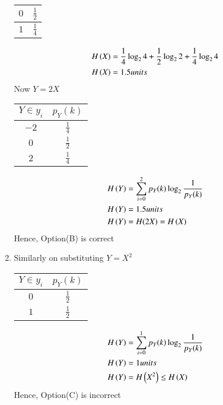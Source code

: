 \documentclass[journal,12pt,onecolumn]{IEEEtran}
\theoremstyle{remark}
\begin{document}
\begin{enumerate}
\begin{table}[htpb]
\begin{tabular}{|c|c|}
\hline
$0$                         & $\frac{1}{2}$  \\
\hline
$1$                         & $\frac{1}{4} $ \\
\hline
\end{tabular}
\end{table}
\begin{align}
H\left(X\right) &= \frac{1}{4}\log _{2}4 + \frac{1}{2}\log _{2}2 +\frac{1}{4}\log _{2}4\\
H\left(X\right) &=  1.5 units
 \end{align}
 Now $ Y = 2X$
 \begin{table}[htpb]
\centering 
\begin{tabular}{|c|c|}
\hline
$Y \in y_i$	&          $p_Y(k)$\\
\hline
$-2$                         & $\frac{1}{4} $       \\
\hline
$0$                         & $\frac{1}{2} $ \\
\hline
$2$                         & $\frac{1}{4}$ \\
\hline
\end{tabular}
\end{table}
\begin{align}
H\left(Y\right) &= \sum_{i=0}^{2}p_Y(k) \log _{2} \frac{1}{p_Y(k)}\\
H\left(Y\right) &=  1.5 units\\
  H\left(Y\right) &= H(2X) =H\left(X\right)
 \end{align}
 Hence, Option(B) is correct\\
 \item Similarly on substituting $Y = X^2$\\
  \begin{table}[htpb]
\centering 
\begin{tabular}{|c|c|}
\hline
$Y \in y_i$	&	$p_Y(k)$\\
\hline
$0$                         & $\frac{1}{2} $       \\
\hline
$1$                         & $\frac{1}{2} $ \\
\hline
\end{tabular}
\end{table}
 \begin{align}
H\left(Y\right) &= \sum_{i=0}^{1}p_Y(k) \log _{2} \frac{1}{p_Y(k)}\\
H\left(Y\right) &=  1units\\
  H\left(Y\right) &= H\left(X^2\right) \leq H\left(X\right)
 \end{align}
 Hence, Option(C) is incorrect\\

\end{enumerate}
\end{document}
